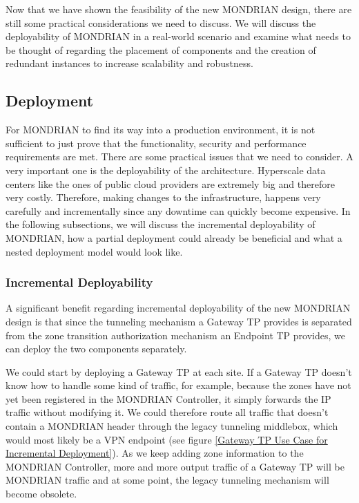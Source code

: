 Now that we have shown the feasibility of the new MONDRIAN design, there are still some practical considerations we need to discuss. We will discuss the deployability of MONDRIAN in a real-world scenario and examine what needs to be thought of regarding the placement of components and the creation of redundant instances to increase scalability and robustness.

\subsection{Deployment}
For MONDRIAN to find its way into a production environment, it is not sufficient to just prove that the functionality, security and performance requirements are met. There are some practical issues that we need to consider. A very important one is the deployability of the architecture. Hyperscale data centers like the ones of public cloud providers are extremely big and therefore very costly. Therefore, making changes to the infrastructure, happens very carefully and incrementally since any downtime can quickly become expensive. In the following subsections, we will discuss the incremental deployability of MONDRIAN, how a partial deployment could already be beneficial and what a nested deployment model would look like.

\subsubsection{Incremental Deployability} \label{Incremental Deployability}
A significant benefit regarding incremental deployability of the new MONDRIAN design is that since the tunneling mechanism a Gateway \acs{TP} provides is separated from the zone transition authorization mechanism an Endpoint \acs{TP} provides, we can deploy the two components separately.

We could start by deploying a Gateway \acs{TP} at each site. If a Gateway \acs{TP} doesn't know how to handle some kind of traffic, for example, because the zones have not yet been registered in the MONDRIAN Controller, it simply forwards the \acs{IP} traffic without modifying it. We could therefore route all traffic that doesn't contain a MONDRIAN header through the legacy tunneling middlebox, which would most likely be a \acs{VPN} endpoint (see figure \ref{Gateway TP Use Case for Incremental Deployment}). As we keep adding zone information to the MONDRIAN Controller, more and more output traffic of a Gateway \acs{TP} will be MONDRIAN traffic and at some point, the legacy tunneling mechanism will become obsolete.

